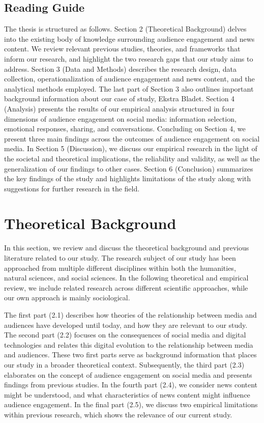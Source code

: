 \documentclass[
]{article}
\begin{document}
\hypertarget{reading-guide}{%
\subsection{Reading Guide}\label{reading-guide}}

The thesis is structured as follows. Section 2 (Theoretical Background)
delves into the existing body of knowledge surrounding audience
engagement and news content. We review relevant previous studies,
theories, and frameworks that inform our research, and highlight the two
research gaps that our study aims to address. Section 3 (Data and
Methods) describes the research design, data collection,
operationalization of audience engagement and news content, and the
analytical methods employed. The last part of Section 3 also outlines
important background information about our case of study, Ekstra Bladet.
Section 4 (Analysis) presents the results of our empirical analysis
structured in four dimensions of audience engagement on social media:
information selection, emotional responses, sharing, and conversations.
Concluding on Section 4, we present three main findings across the
outcomes of audience engagement on social media. In Section 5
(Discussion), we discuss our empirical research in the light of the
societal and theoretical implications, the reliability and validity, as
well as the generalization of our findings to other cases. Section 6
(Conclusion) summarizes the key findings of the study and highlights
limitations of the study along with suggestions for further research in
the field.

\pagebreak

\hypertarget{theoretical-background}{%
\section{Theoretical Background}\label{theoretical-background}}

In this section, we review and discuss the theoretical background and
previous literature related to our study. The research subject of our
study has been approached from multiple different disciplines within
both the humanities, natural sciences, and social sciences. In the
following theoretical and empirical review, we include related research
across different scientific approaches, while our own approach is mainly
sociological.

The first part (2.1) describes how theories of the relationship between
media and audiences have developed until today, and how they are
relevant to our study. The second part (2.2) focuses on the consequences
of social media and digital technologies and relates this digital
evolution to the relationship between media and audiences. These two
first parts serve as background information that places our study in a
broader theoretical context. Subsequently, the third part (2.3)
elaborates on the concept of audience engagement on social media and
presents findings from previous studies. In the fourth part (2.4), we
consider news content might be understood, and what characteristics of
news content might influence audience engagement. In the final part
(2.5), we discuss two empirical limitations within previous research,
which shows the relevance of our current study.
\end{document}
